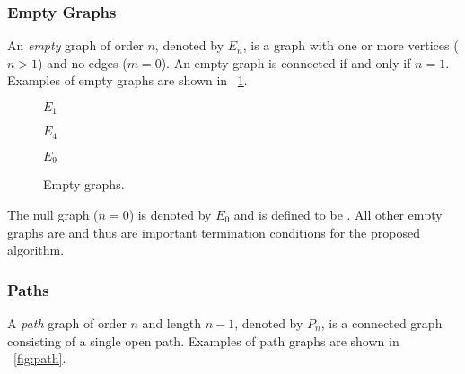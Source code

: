 \subsubsection{Empty Graphs}\label{sec:sub:sub:empty}

An \emph{empty} graph of order \(n\), denoted by \(E_n\), is a graph with one or more vertices (\(n>1\)) and no
edges (\(m=0\)).  An empty graph is connected if and only if \(n=1\).  Examples of empty graphs are shown in
\figurename~\ref{fig:empty}.

\begin{figure}[H]
  \begin{minipage}{1in}
    \centering

    \(E_1\)
  \end{minipage}
  \begin{minipage}{2.5in}
    \centering

    \(E_4\)
  \end{minipage}
  \begin{minipage}{2in}
    \centering

    \(E_9\)
  \end{minipage}
  \caption{Empty graphs.}
  \label{fig:empty}
\end{figure}

The null graph (\(n=0\)) is denoted by \(E_0\) and is defined to be .  All other empty graphs are
 and thus are important termination conditions for the proposed algorithm.

\subsubsection{Paths}\label{sec:sub:sub:paths}

A \emph{path} graph of order \(n\) and length \(n-1\), denoted by \(P_n\), is a connected graph consisting of a
single open path.  Examples of path graphs are shown in \figurename~\ref{fig:path}.

